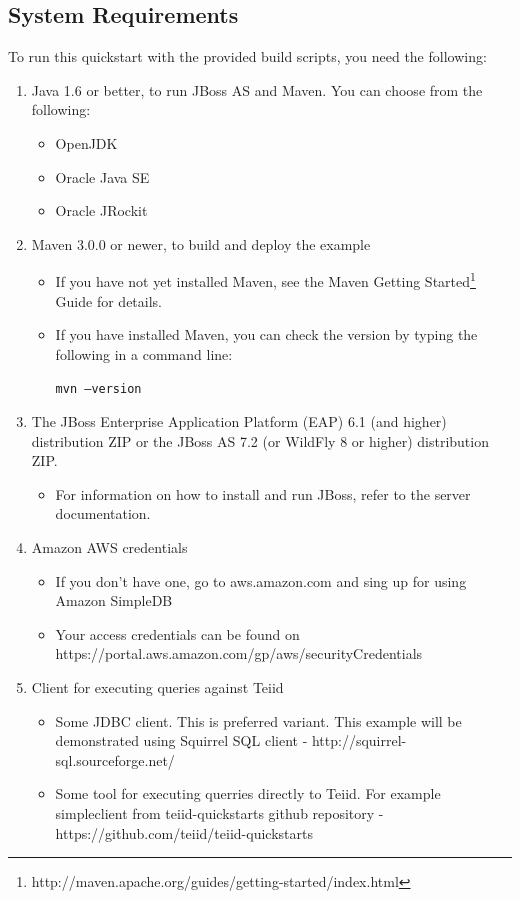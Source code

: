 \documentclass[oneside,12pt,final]{fithesis2}
\begin{document}
\subsection*{System Requirements}
To run this quickstart with the provided build scripts, you need the following:
\begin{enumerate}
 \item Java 1.6 or better, to run JBoss AS and Maven. You can choose from the following:
 \begin{itemize}
  \item OpenJDK
  \item Oracle Java SE
  \item Oracle JRockit
 \end{itemize}

 \item Maven 3.0.0 or newer, to build and deploy the example
 \begin{itemize}
  \item If you have not yet installed Maven, see the Maven Getting Started\footnote{http://maven.apache.org/guides/getting-started/index.html} Guide for details.
  \item If you have installed Maven, you can check the version by typing the following in a command line:

  \texttt{mvn --version}
 \end{itemize}
 
 \item The JBoss Enterprise Application Platform (EAP) 6.1 (and higher) distribution ZIP or the JBoss AS 7.2 (or WildFly 8 or higher) distribution ZIP.
 \begin{itemize}
  \item For information on how to install and run JBoss, refer to the server documentation.
 \end{itemize}

 \item Amazon AWS credentials
 \begin{itemize}
  \item If you don't have one, go to aws.amazon.com and sing up for using Amazon SimpleDB
  \item Your access credentials can be found on https://portal.aws\allowbreak .amazon.com/gp/aws/securityCredentials
 \end{itemize}

 \item Client for executing queries against Teiid
 \begin{itemize}
  \item Some JDBC client. This is preferred variant. This example will be demonstrated using Squirrel SQL client - http://squirrel-sql.sourceforge.net/
  \item Some tool for executing querries directly to Teiid. For example simpleclient from teiid-quickstarts github repository - https://github.com/teiid/teiid-quickstarts
 \end{itemize}
\end{enumerate}
\end{document}
